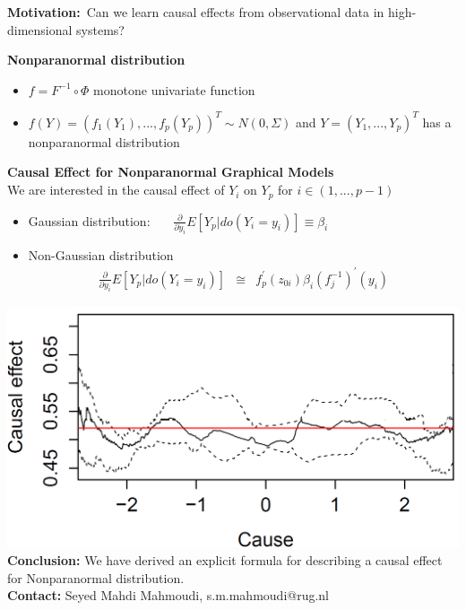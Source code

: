 \documentclass[a0paper,portrait]{baposter}
\newcommand{\doop}{do}
\begin{document}
\begin{poster}
{ \textbf{Motivation:}\
 Can we learn causal effects from observational data in
high-dimensional systems?

 \textbf{ Nonparanormal distribution}
 \vspace{-.2cm}
\begin{itemize}
\item $f=F^{-1}\circ \Phi$   monotone univariate function
 \item$f(Y)=(f_1(Y_1),...,f_{p}(Y_{p}))^{T}\sim N(0,\Sigma) $ and
$Y=(Y_1,...,Y_p)^{T}$ has a nonparanormal distribution
\vspace{-0.3cm}
\end{itemize}
  \textbf{Causal Effect for Nonparanormal Graphical Models }\\
 We are interested in the causal effect of $Y_i$ on $ Y_p$ for $i\in (1,...,p-1)$
 \begin{itemize}
\item Gaussian distribution: ~~~${\frac{\partial}{\partial y_i}} E[Y_p|\doop(Y_i = y_i)]\equiv\beta_i$
\item  Non-Gaussian distribution
\vspace{-.26cm}
\begin{eqnarray*}
{\frac{\partial}{\partial y_i}} E[Y_p|\doop(Y_i = y_i)] &\cong &f_p^{'}(z_{0i})\beta_i (f_j^{-1})^ {'}(y_i) \nonumber
\end{eqnarray*}
\end{itemize}
\vspace{-.5cm}
\hspace{1.5cm}\includegraphics[scale=0.2]{mahmodi1}
\vspace{-.3cm}
 \textbf{Conclusion: }
We have derived an explicit formula for describing a causal effect for Nonparanormal distribution.\\
\textbf{Contact: }Seyed Mahdi Mahmoudi, s.m.mahmoudi@rug.nl
}


\end{poster}
\end{document}
